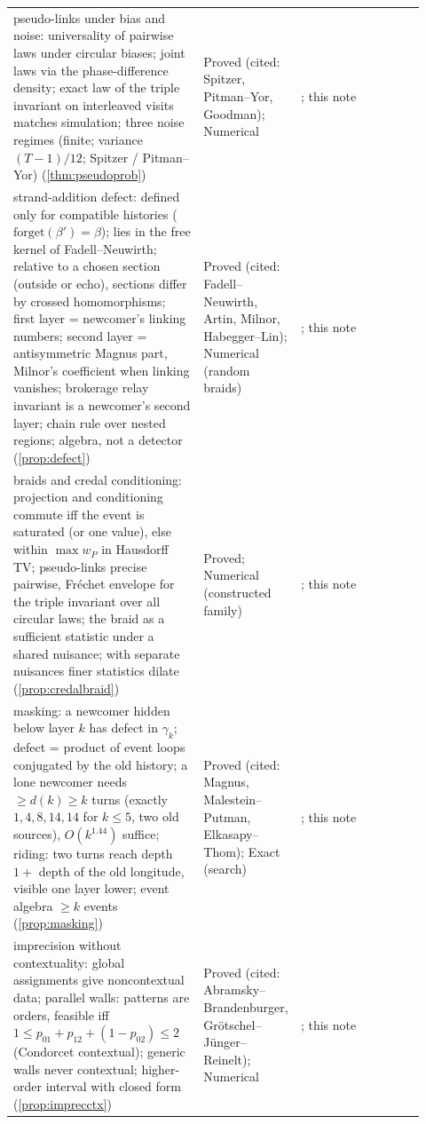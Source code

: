 \documentclass[11pt]{article}
\theoremstyle{definition}\newtheorem{definition}[theorem]{Definition}\newtheorem{remark}[theorem]{Remark}\newtheorem{example}[theorem]{Example}\newtheorem{problem}[theorem]{Open problem}\crefname{problem}{Problem}{Problems}
\begin{document}
{\begin{longtable}{p{0.46\linewidth}p{0.16\linewidth}p{0.3\linewidth}}
\rowcolor{stNew} pseudo-links under bias and noise: universality of pairwise laws under circular biases; joint laws via the phase-difference density; exact law of the triple invariant on interleaved visits matches simulation; three noise regimes (finite; variance $(T-1)/12$; Spitzer / Pitman--Yor) (\cref{thm:pseudoprob}) & Proved (cited: Spitzer, Pitman--Yor, Goodman); Numerical & \cite{Spitzer1958,PitmanYor1986,Goodman1985}; this note\\
\rowcolor{stNew} strand-addition defect: defined only for compatible histories ($\mathrm{forget}(\beta')=\beta$); lies in the free kernel of Fadell--Neuwirth; relative to a chosen section (outside or echo), sections differ by crossed homomorphisms; first layer = newcomer's linking numbers; second layer = antisymmetric Magnus part, Milnor's coefficient when linking vanishes; brokerage relay invariant is a newcomer's second layer; chain rule over nested regions; algebra, not a detector (\cref{prop:defect}) & Proved (cited: Fadell--Neuwirth, Artin, Milnor, Habegger--Lin); Numerical (random braids) & \cite{FadellNeuwirth1962,Artin1947,Milnor1954,HabeggerLin1990}; this note\\
\rowcolor{stNew} braids and credal conditioning: projection and conditioning commute iff the event is saturated (or one value), else within $\max w_P$ in Hausdorff TV; pseudo-links precise pairwise, Fr\'echet envelope for the triple invariant over all circular laws; the braid as a sufficient statistic under a shared nuisance; with separate nuisances finer statistics dilate (\cref{prop:credalbraid}) & Proved; Numerical (constructed family) & \cite{Walley1991,SeidenfeldWasserman1993}; this note\\
\rowcolor{stNew} masking: a newcomer hidden below layer $k$ has defect in $\gamma_k$; defect = product of event loops conjugated by the old history; a lone newcomer needs $\ge d(k)\ge k$ turns (exactly $1,4,8,14,14$ for $k\le5$, two old sources), $O(k^{1.44})$ suffice; riding: two turns reach depth $1+$ depth of the old longitude, visible one layer lower; event algebra $\ge k$ events (\cref{prop:masking}) & Proved (cited: Magnus, Malestein--Putman, Elkasapy--Thom); Exact (search) & \cite{MalesteinPutman2010,MalesteinPutman2023,ElkasapyThom2013,Elkasapy2016}; this note\\
\rowcolor{stNew} imprecision without contextuality: global assignments give noncontextual data; parallel walls: patterns are orders, feasible iff $1\le p_{01}+p_{12}+(1-p_{02})\le2$ (Condorcet contextual); generic walls never contextual; higher-order interval with closed form (\cref{prop:imprecctx}) & Proved (cited: Abramsky--Brandenburger, Gr\"otschel--J\"unger--Reinelt); Numerical & \cite{AbramskyBrandenburger2011,GrotschelJungerReinelt1985}; this note\\

\end{longtable}}
\end{document}
